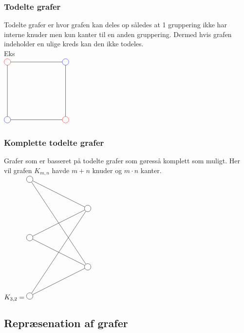 \documentclass[12pt, a4paper]{article}
\begin{document}
			\subsubsection{Todelte grafer}
				Todelte grafer er hvor grafen kan deles op således at 1 gruppering ikke har interne knuder men kun kanter til en anden gruppering. Dermed hvis grafen indeholder en ulige kreds kan den ikke todeles.\\
				Eks\\
				$\begin{tikzpicture}[scale=3]
						\tikzstyle{vertex}=[circle,draw=black]
						\node[vertex, color=blue](v1) at (0,0){};
						\node[vertex,color =red](v2) at (1,0){};
						\node[vertex,color=red](v4) at (0,1) {};
						\node[vertex,color=blue](v3) at (1,1) {};
						\path[-]
							(v1) edge node {}(v2)
							(v2) edge node {}(v3)
							(v4) edge node {}(v1)
							(v3) edge node {}(v4);
					\end{tikzpicture}$\\
			\subsubsection{Komplette todelte grafer}
			Grafer som er basseret på todelte grafer som gøresså komplett som muligt. Her vil grafen $K_{m,n}$ havde $m+n$ knuder og $m\cdot n$ kanter.\\	
				$K_{3,2}=\begin{tikzpicture}[scale=3]
						\tikzstyle{vertex}=[circle,draw=black]
						\node[vertex](v1) at (0,0){};
						\node[vertex](v2) at (0,1){};
						\node[vertex](v3) at (0,2) {};
						\node[vertex](v4) at (1,0.5) {};
						\node[vertex](v5) at (1,1.5) {};
						\path[-]
							(v1) edge node {}(v4)
							(v1) edge node {}(v5)
							(v2) edge node {}(v4)
							(v2) edge node {}(v5)
							(v3) edge node {}(v4)
							(v3) edge node {}(v5);
					\end{tikzpicture}$\\
	\subsection{Repræsenation af grafer}
\end{document}
